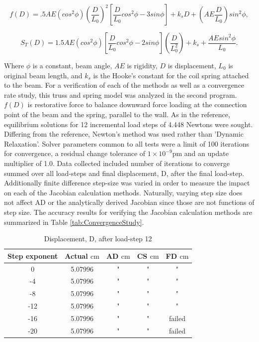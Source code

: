 \documentclass[preprint,12pt]{elsarticle}
\begin{document}
\begin{equation} 
    \label{eqn:TrussForce}
    f(D) = .5AE(cos^{2}\phi)(\frac{D}{L_{0}})^{2}[\frac{D}{L_{0}}cos^{2}\phi - 3sin\phi] + k_{s}D + (AE\frac{D}{L_{0}})sin^{2}\phi,
\end{equation} 

\begin{equation} 
    \label{eqn:TrussStiffness}
    S_{T}(D) = 1.5AE(cos^{2}\phi)[\frac{D}{L_{0}}cos^{2}\phi - 2sin\phi](\frac{D}{L_{0}^{2}}) + k_{s} + \frac{AEsin^{2}\phi}{L_{0}}.
\end{equation}

Where $\phi$ is a constant, beam angle, $AE$ is rigidity, $D$ is displacement,
$L_{0}$ is original beam length, and $k_{s}$ is the Hooke's constant for the
coil spring attached to the beam. For a verification of each of the methods as
well as a convergence rate study, this truss and spring model was analyzed in
the second program. $f(D)$ is restorative force to balance downward force
loading at the connection point of the beam and the spring, parallel to the
wall. As in the reference, equilibrium solutions for 12 incremental load steps
of 4.448 Newtons were sought. Differing from the reference, Newton's method was
used rather than 'Dynamic Relaxation'. Solver parameters common to all tests
were a limit of 100 iterations for convergence, a residual change tolerance of
$1\times{10^{-9}} \si{\pico\meter}$ and an update multiplier of 1.0. Data
collected included number of iterations to converge summed over all load-steps
and final displacement, D, after the final load-step. Additionally
finite difference step-size was varied in order to measure the impact on each
of the Jacobian calculation methods. Naturally, varying step size does not
affect AD or the analytically derived Jacobian since those are not functions
of step size. The accuracy results for
verifying the Jacobian calculation methods are summarized in Table
\ref{tab:ConvergenceStudy}. 

\begin{table}[!ht]    
  \centering
        \caption{Displacement, D, after load-step 12} \label{tab:Verification}   
        \begin{tabular}{c c c c c}
         \toprule
         Step exponent & Actual $\si{\centi\meter}$ & AD $\si{\centi\meter}$ & CS $\si{\centi\meter}$ & FD $\si{\centi\meter}$\\ 
        \midrule
        0 & 5.07996 & " & " & "\\
        -4 & 5.07996 & " & " & "\\
        -8 & 5.07996 & " & " & "\\
        -12 & 5.07996 & " & " & " \\
        -16 & 5.07996 & " & " & failed \\
        -20 & 5.07996 & " & " & failed \\
        \bottomrule
    \end{tabular}
\end{table}
\end{document}
